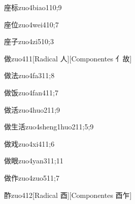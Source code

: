 \begin{verbete}{座标}{zuo4biao1}{10;9}
\end{verbete}

\begin{verbete}{座位}{zuo4wei4}{10;7}
\end{verbete}

\begin{verbete}{座子}{zuo4zi5}{10;3}
\end{verbete}

\begin{verbete}{做}{zuo4}{11}[Radical 人][Componentes 亻故]
\end{verbete}

\begin{verbete}{做法}{zuo4fa3}{11;8}
\end{verbete}

\begin{verbete}{做饭}{zuo4fan4}{11;7}
\end{verbete}

\begin{verbete}{做活}{zuo4huo2}{11;9}
\end{verbete}

\begin{verbete}{做生活}{zuo4sheng1huo2}{11;5;9}
\end{verbete}

\begin{verbete}{做戏}{zuo4xi4}{11;6}
\end{verbete}

\begin{verbete}{做眼}{zuo4yan3}{11;11}
\end{verbete}

\begin{verbete}{做作}{zuo4zuo5}{11;7}
\end{verbete}

\begin{verbete}{酢}{zuo4}{12}[Radical 酉][Componentes 酉乍]
\end{verbete}

